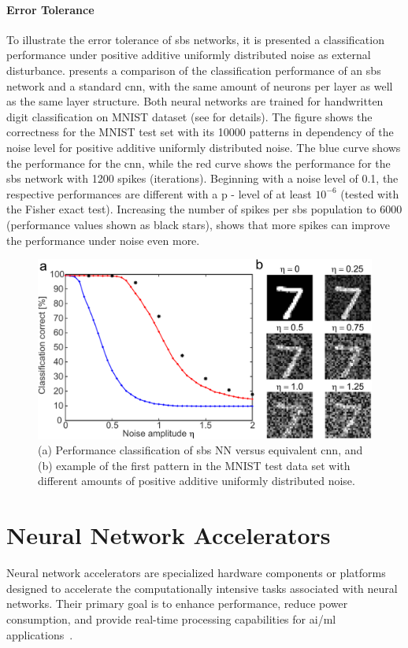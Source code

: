\paragraph{Error Tolerance}

To illustrate the error tolerance of \gls{sbs} networks, it is presented a classification performance under positive additive uniformly distributed noise as external disturbance.  presents a comparison of the classification performance of an \gls{sbs} network and a standard \gls{cnn}, with the same amount of
neurons per layer as well as the same layer structure. Both neural networks are trained for handwritten digit classification on MNIST dataset \cite{lecun1998mnist} (see \cite{rotermund2019Backpropagation} for details). The figure shows the correctness for the MNIST test set with its \num[group-separator={,}]{10000} patterns in dependency of the noise level for positive additive
uniformly distributed noise. The blue curve shows the performance for
the \gls{cnn}, while the red curve shows the performance for
the \gls{sbs} network with \num[group-separator={,}]{1200} spikes (iterations). Beginning
with a noise level of 0.1, the respective performances are different
with a p - level of at least $10^{-6}$ (tested with the Fisher exact
test). Increasing the number of spikes per \gls{sbs} population to \num[group-separator={,}]{6000}
(performance values shown as black stars), shows that more spikes can
improve the performance under noise even more.

\begin{figure}
	\centering
	\includegraphics[width=0.5\columnwidth]{./chapters/sbs_accelerator/figures/sbs_robustnes.pdf}
	\caption{(a) Performance classification of \gls{sbs} NN versus equivalent \gls{cnn}, and (b) example of the first pattern in the MNIST test data set with different amounts of positive additive uniformly distributed noise.}
	\label{fig:robustnes_sbs}
\end{figure}


\section{Neural Network Accelerators}
Neural network accelerators are specialized hardware components or platforms designed to accelerate the computationally intensive tasks associated with neural networks. Their primary goal is to enhance performance, reduce power consumption, and provide real-time processing capabilities for \gls{ai}/\gls{ml} applications~\cite{sze2017efficient}.

